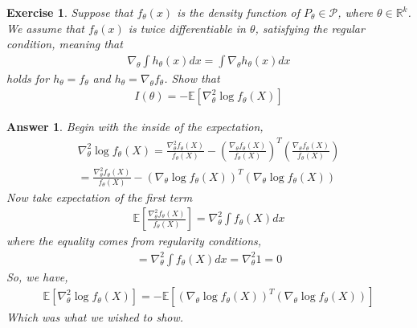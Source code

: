 \documentclass[12pt]{article}
\theoremstyle{colon}
\newtheorem{exercise}{Exercise}
\newtheorem*{answer}{Answer}
\begin{document}
\clearpage

\begin{exercise}
  Suppose that $f_\theta(x)$ is the density function of $P_\theta \in \mathcal{P}$, where $\theta \in \mathbb{R}^k$. We assume that $f_\theta(x)$ is twice differentiable in $\theta$, satisfying the regular condition, meaning that
  \begin{gather*}
    \nabla_\theta \int h_\theta (x) dx = \int \nabla_\theta h_\theta(x) dx
  \end{gather*}
  holds for $h_\theta = f_\theta$ and $h_\theta = \nabla_\theta f_\theta$. Show that
  \begin{gather*}
    I(\theta) = -\mathbb{E}[\nabla_\theta^2 \log f_\theta (X)]
  \end{gather*}
\end{exercise}

\begin{answer}
  Begin with the inside of the expectation,
  \begin{gather*}
    \nabla_\theta^2 \log f_\theta (X) = \frac{\nabla_\theta^2 f_\theta (X)}{f_\theta(X)} - \left( \frac{\nabla_\theta f_\theta(X)}{f_\theta(X)}\right)^T \left( \frac{\nabla_\theta f_\theta(X)}{f_\theta(X)}\right) \\
    = \frac{\nabla_\theta^2 f_\theta (X)}{f_\theta(X)} - ( \nabla_\theta \log f_\theta(X))^T( \nabla_\theta \log f_\theta(X))
  \end{gather*}
  Now take expectation of the first term
  \begin{gather*}
    \mathbb{E} \left[ \frac{\nabla_\theta^2 f_\theta (X)}{f_\theta(X)} \right] = \nabla_\theta^2 \int f_\theta(X) dx
  \end{gather*}
  where the equality comes from regularity conditions,
  \begin{gather*}
    = \nabla_\theta^2 \int f_\theta(X) dx = \nabla_\theta^2 1 = 0
  \end{gather*}
  So, we have,
  \begin{gather*}
    \mathbb{E}[\nabla_\theta^2 \log f_\theta (X)] = - \mathbb{E}[( \nabla_\theta \log f_\theta(X))^T( \nabla_\theta \log f_\theta(X))]
  \end{gather*}
  Which was what we wished to show.
\end{answer}

\clearpage
\end{document}
